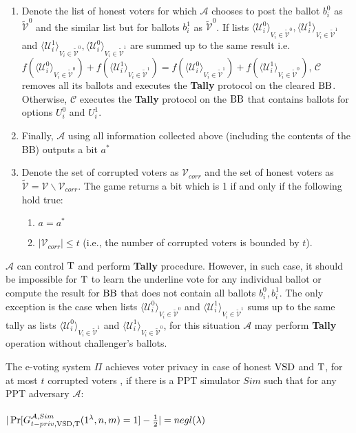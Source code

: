 \begin{enumerate}
\item Denote the list of honest voters for which $\mathcal{A}$ chooses to post the ballot  $b_i^0$  as $ \tilde{\mathcal{V}}^0$ and the similar list but for ballots $b_i^1$ as $ \tilde{\mathcal{V}}^0$.  If  lists $\langle \mathcal{U}^0_i \rangle _{V_i \in \tilde{\mathcal{V}}^0}, \langle \mathcal{U}^1_i \rangle _{V_i \in \tilde{\mathcal{V}}^1}$ and $\langle \mathcal{U}^1_i \rangle _{V_i \in \tilde{\mathcal{V}}^0}, \langle \mathcal{U}^0_i \rangle _{V_i \in \tilde{\mathcal{V}}^1}$ are summed up to the same result i.e. $f(\langle \mathcal{U}^0_i \rangle _{V_i \in \tilde{\mathcal{V}}^0} ) + f(\langle \mathcal{U}^1_i \rangle _{V_i \in \tilde{\mathcal{V}}^1} ) =  f(\langle \mathcal{U}^0_i \rangle _{V_i \in \tilde{\mathcal{V}}^1} ) +  f(\langle \mathcal{U}^1_i \rangle _{V_i \in \tilde{\mathcal{V}}^0} )$, $\mathcal{C}$ removes all its ballots and executes the \textbf{Tally} protocol on the cleared $\operatorname{BB}$. Otherwise, $\mathcal{C}$ executes the \textbf{Tally} protocol on the $\operatorname{BB}$ that contains ballots for options $U_i^0$ and $U_i^1$. 
\item Finally, $\mathcal{A}$ using all information collected above (including the contents of the BB) outputs a bit $a^*$
\item Denote the set of corrupted voters as $\mathcal{V}_{corr}$ and the set of honest voters as $\tilde{\mathcal{V}}= \mathcal{V} \backslash \mathcal{V}_{corr}$. The game returns a bit which is 1 if and only if the following hold true:
\begin{enumerate}
 \item $a = a^*$
 \item $|\mathcal{V}_{corr}| \leq t$ (i.e., the number of corrupted voters is bounded by $t$).
\end{enumerate}
\end{enumerate}
\begin{remark}
$\mathcal{A}$ can control $\operatorname{T}$ and perform \textbf{Tally} procedure. However, in such case, it should be impossible for $\operatorname{T}$ to learn the underline vote for any individual ballot or compute the result for $\operatorname{BB}$ that does not contain all ballots $b_i^0,b_i^1$. The only exception is the case when lists  $\langle \mathcal{U}^0_i \rangle _{V_i \in \tilde{\mathcal{V}}^0} $ and  $\langle \mathcal{U}^1_i \rangle _{V_i \in \tilde{\mathcal{V}}^1} $ sums up to the same tally as lists  $\langle \mathcal{U}^0_i \rangle _{V_i \in \tilde{\mathcal{V}}^1} $ and  $\langle \mathcal{U}^1_i \rangle _{V_i \in \tilde{\mathcal{V}}^0} $, for this situation $\mathcal{A}$ may perform \textbf{Tally} operation without challenger's ballots. 
\end{remark}
\begin{definition}
The e-voting system $\Pi$ achieves voter privacy in case of honest $\operatorname{VSD}$ and $\operatorname{T}$, for at most $t$ corrupted voters , if there is a PPT simulator $Sim$ such that for any PPT adversary $\mathcal{A}$:\\\\
 $|\Pr[G_{t-priv,\operatorname{VSD},\operatorname{T}}^{\mathcal{A},Sim}(1^{\lambda},n,m) = 1] - \frac{1}{2}| = negl(\lambda)$
 \end{definition}
